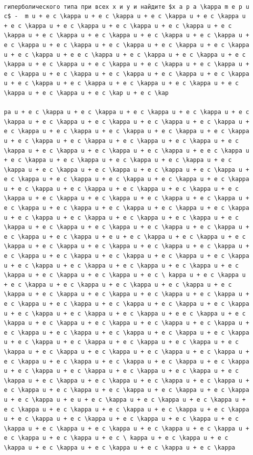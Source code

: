 \documentclass[
  ukrainian,
]{article}
\begin{document}
\begin{verbatim}

гиперболического типа при всех x и y и найдите $x a p a \kappa m e p u c$ -  m u + e c \kappa u + e c \kappa u + e c \kappa u + e c \kappa u + e c \kappa u + e c \kappa u + e c \kappa u + e c \kappa u + e c \kappa u + e c \kappa u + e c \kappa u + e c \kappa u + e c \kappa u + e c \kappa u + e c \kappa u + e c \kappa u + e c \kappa u + e c \kappa u + e c \kappa u + e e c \kappa u + e c \kappa u + e c \kappa u + e c \kappa u + e c \kappa u + e c \kappa u + e c \kappa u + e c \kappa u + e c \kappa u + e c \kappa u + e c \kappa u + e c \kappa u + e c \kappa u + e c \kappa u + e c \kappa u + e c \kappa u + e c \kappa u + e c \kappa u + e c \kappa u + e c \kap u + e c \kap

pa u + e c \kappa u + e c \kappa u + e c \kappa u + e c \kappa u + e c \kappa u + e c \kappa u + e c \kappa u + e c \kappa u + e c \kappa u + e c \kappa u + e c \kappa u + e c \kappa u + e c \kappa u + e c \kappa u + e c \kappa u + e c \kappa u + e c \kappa u + e c \kappa u + e c \kappa u + e c \kappa u + e c \kappa u + e c \kappa u + e e c \kappa u + e c \kappa u + e c \kappa u + e c \kappa u + e c \kappa u + e c \kappa u + e c \kappa u + e c \kappa u + e c \kappa u + e c \kappa u + e c \kappa u + e c \kappa u + e c \kappa u + e c \kappa u + e c \kappa u + e c \kappa u + e c \kappa u + e c \kappa u + e c \kappa u + e c \kappa u + e c \kappa u + e c \kappa u + e c \kappa u + e c \kappa u + e c \kappa u + e c \kappa u + e c \kappa u + e c \kappa u + e c \kappa u + e c \kappa u + e c \kappa u + e c \kappa u + e c \kappa u + e c \kappa u + e c \kappa u + e c \kappa u + e c \kappa u + e c \kappa u + e c \kappa u + e c \kappa u + e u + e c \kappa u + e c \kappa u + e c \kappa u + e c \kappa u + e c \kappa u + e c \kappa u + e c \kappa u + e c \kappa u + e c \kappa u + e c \kappa u + e c \kappa u + e c \kappa u + e c \kappa u + e c \kappa u + e c \kappa u + e c \kappa u + e c \kappa u + e c \kappa u + e c \kappa u + e c \ kappa u + e c \kappa u + e c \kappa u + e c \kappa u + e c \kappa u + e c \kappa u + e c \kappa u + e c \kappa u + e c \kappa u + e c \kappa u + e c \kappa u + e c \kappa u + e c \kappa u + e c \kappa u + e c \kappa u + e c \kappa u + e c \kappa u + e c \kappa u + e c \kappa u + e e c \kappa u + e c \kappa u + e c \kappa u + e c \kappa u + e c \kappa u + e c \kappa u + e c \kappa u + e c \kappa u + e c \kappa u + e c \kappa u + e c \kappa u + e c \kappa u + e c \kappa u + e c \kappa u + e c \kappa u + e c \kappa u + e c \kappa u + e c \kappa u + e c \kappa u + e c \kappa u + e c \kappa u + e c \kappa u + e c \kappa u + e c \kappa u + e c \kappa u + e c \kappa u + e c \kappa u + e c \kappa u + e c \kappa u + e c \kappa u + e c \kappa u + e c \kappa u + e c \kappa u + e c \kappa u + e c \kappa u + e c \kappa u + e c \kappa u + e c \kappa u + e c \kappa u + e c \kappa u + e u + e c \kappa u + e c \kappa u + e c \kappa u + e c \kappa u + e c \kappa u + e c \kappa u + e c \kappa u + e c \kappa u + e c \kappa u + e c \kappa u + e c \kappa u + e c \kappa u + e c \kappa u + e c \kappa u + e c \kappa u + e c \kappa u + e c \kappa u + e c \kappa u + e c \kappa u + e c \ kappa u + e c \kappa u + e c \kappa u + e c \kappa u + e c \kappa u + e c \kappa u + e c \kappa 
\end{verbatim}
\end{document}
